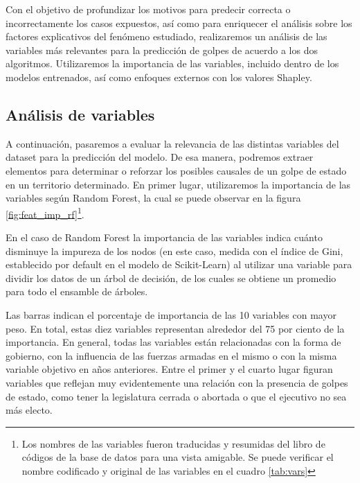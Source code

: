 \documentclass{article}
\begin{document}
Con el objetivo de profundizar los motivos para predecir correcta o incorrectamente los casos
expuestos, así como para enriquecer el análisis sobre los factores explicativos del fenómeno 
estudiado, realizaremos un análisis de las variables más relevantes para la predicción de golpes
de acuerdo a los dos algoritmos. Utilizaremos la importancia de las variables, incluido dentro
de los modelos entrenados, así como enfoques externos con los valores Shapley.

\subsection{Análisis de variables}
A continuación, pasaremos a evaluar la relevancia de las distintas variables del dataset
para la predicción del modelo. De esa manera, podremos extraer elementos para determinar
o reforzar los posibles causales de un golpe de estado en un territorio determinado. En 
primer lugar, utilizaremos la importancia de las variables según Random Forest, la cual
se puede observar en la figura \ref{fig:feat_imp_rf}\footnote{Los nombres de las variables fueron
traducidas y resumidas del libro de códigos de la base de datos para una vista amigable.
Se puede verificar el nombre codificado y original de las variables en el cuadro \ref{tab:vars}}.

En el caso de Random Forest la importancia de las variables indica cuánto disminuye la impureza
de los nodos (en este caso, medida con el índice de Gini, establecido por default en el modelo de 
Scikit-Learn) al utilizar una variable para dividir los datos de un árbol de decisión, de los cuales
se obtiene un promedio para todo el ensamble de árboles.

Las barras indican el porcentaje de importancia de las 10 variables con mayor peso. En total, estas 
diez variables representan alrededor del 75 por ciento de la importancia. En general, todas las 
variables están relacionadas con la forma de gobierno, con la influencia de las fuerzas armadas en el 
mismo o con la misma variable objetivo en años anteriores. Entre el primer y el cuarto lugar figuran 
variables que reflejan muy evidentemente una relación con la presencia de golpes de estado, como 
tener la legislatura cerrada o abortada o que el ejecutivo no sea más electo.
\end{document}
